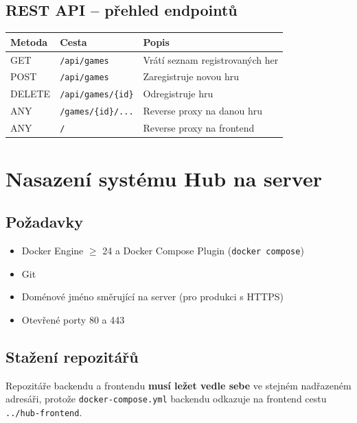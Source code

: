 \documentclass[12pt,a4paper]{article}
\begin{document}
\subsection{REST API -- přehled endpointů}

\begin{center}
\begin{tabular}{@{}lll@{}}
\toprule
\textbf{Metoda} & \textbf{Cesta} & \textbf{Popis} \\
\midrule
GET    & \texttt{/api/games}        & Vrátí seznam registrovaných her \\
POST   & \texttt{/api/games}        & Zaregistruje novou hru \\
DELETE & \texttt{/api/games/\{id\}} & Odregistruje hru \\
ANY    & \texttt{/games/\{id\}/...} & Reverse proxy na danou hru \\
ANY    & \texttt{/}                 & Reverse proxy na frontend \\
\bottomrule
\end{tabular}
\end{center}

\clearpage
\section{Nasazení systému Hub na server}

\subsection{Požadavky}

\begin{itemize}
  \item Docker Engine \(\geq\) 24 a Docker Compose Plugin (\texttt{docker compose})
  \item Git
  \item Doménové jméno směrující na server (pro produkci s HTTPS)
  \item Otevřené porty 80 a 443
\end{itemize}

\subsection{Stažení repozitářů}

Repozitáře backendu a frontendu \textbf{musí ležet vedle sebe} ve stejném nadřazeném adresáři, protože \texttt{docker-compose.yml} backendu odkazuje na frontend cestu \texttt{../hub-frontend}.
\end{document}
